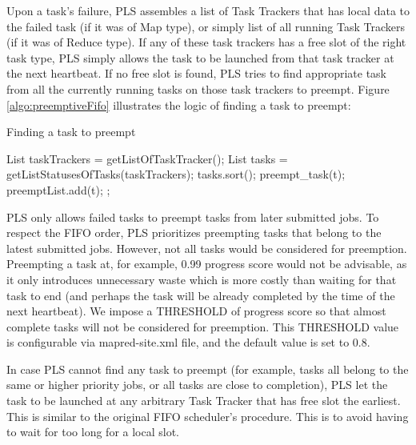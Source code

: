 \documentclass[runningheads,a4paper]{llncs}
\begin{document}
Upon a task’s failure, PLS assembles a list of Task Trackers that has local data to the failed task (if it was of Map type), or simply list of all running Task Trackers (if it was of Reduce type).  If any of these task trackers has a free slot of the right task type, PLS simply allows the task to be launched from that task tracker at the next heartbeat. If no free slot is found, PLS tries to find appropriate task from all the currently running tasks on those task trackers to preempt. Figure \ref{algo:preemptiveFifo} illustrates the logic of finding a task to preempt:
\begin{algorithm}[!h]
\caption{Finding a task to preempt}
\label{algo:preemptiveFifo}
\begin{algorithmic}
\STATE List taskTrackers = getListOfTaskTracker();
\STATE List tasks = getListStatusesOfTasks(taskTrackers);
\STATE tasks.sort();
\STATE preempt\_task(t);
\STATE preemptList.add(t);
;
\ENDIF
\ENDFOR
\end{algorithmic}
\end{algorithm}

PLS only allows failed tasks to preempt tasks from later submitted jobs. To respect the FIFO order, PLS prioritizes preempting tasks that belong to the latest submitted jobs. However, not all tasks would be considered for preemption. Preempting a task at, for example, 0.99 progress score would not be advisable, as it only introduces unnecessary waste which is more costly than waiting for that task to end (and perhaps the task will be already completed by the time of the next heartbeat). We impose a THRESHOLD of progress score so that almost complete tasks will not be considered for preemption. This THRESHOLD value is configurable via mapred-site.xml file, and the default value is set to 0.8.

In case PLS cannot find any task to preempt (for example, tasks all belong to the same or higher priority jobs, or all tasks are close to completion), PLS let the task to be launched at any arbitrary Task Tracker that has free slot the earliest. This is similar to the original FIFO scheduler’s procedure. This is to avoid having to wait for too long for a local slot.
\end{document}
